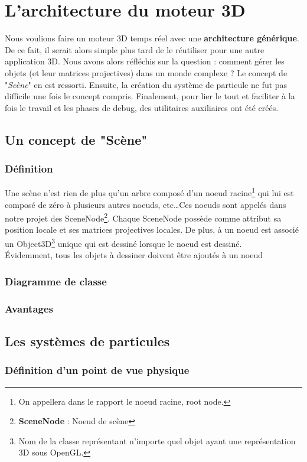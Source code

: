 \chapter{L'architecture du moteur 3D}
 Nous voulions faire un moteur 3D temps réel avec une \textbf{architecture générique}. De ce fait, il serait alors simple plus tard de le réutiliser pour une autre application 3D. Nous avons alors réfléchis sur la question : comment gérer les objets (et leur matrices projectives) dans un monde complexe ? Le concept de "\textit{Scène}" en est ressorti. Ensuite, la création du système de particule ne fut pas difficile une fois le concept compris. Finalement, pour lier le tout et faciliter à la fois le travail et les phases de debug, des utilitaires auxiliaires ont été créés.
 \section{Un concept de "Scène"}
  \subsection{Définition}
   Une scène n'est rien de plus qu'un arbre composé d'un noeud racine\footnote{On appellera dans le rapport le noeud racine, root node.} qui lui est composé de zéro à plusieurs autres noeuds, etc\ldots Ces noeuds sont appelés dans notre projet des SceneNode\footnote{\textbf{SceneNode} : Noeud de scène}. Chaque SceneNode possède comme attribut sa position locale et ses matrices projectives locales. De plus, à un noeud est associé un Object3D\footnote{Nom de la classe représentant n'importe quel objet ayant une représentation 3D sous OpenGL.}  unique qui est dessiné lorsque le noeud est dessiné. \\
\indent Évidemment, tous les objets à dessiner doivent être ajoutés à un noeud
  \subsection{Diagramme de classe}
  \subsection{Avantages}
 \section{Les systèmes de particules}
  \subsection{Définition d'un point de vue physique}


